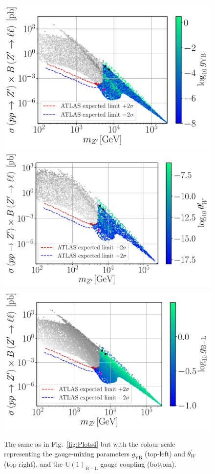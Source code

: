 \documentclass[a4paper,11pt]{article}
\renewcommand{\[}{\left[}
\renewcommand{\]}{\right]}
\newcommand{\U}[1]{\mathrm{U}(1)_{\mathrm{#1}}}			%
\newcommand{\ro}[1]{\textrm{#1}}
\begin{document}
\begin{figure}[!htb]
	\centering
	\includegraphics[scale=0.37]{mZp_Xsec_gYB.pdf}
	\includegraphics[scale=0.37]{mZp_Xsec_twp.pdf}
	\includegraphics[scale=0.37]{mZp_Xsec_gBL.pdf}	
	\caption{The same as in Fig.~\ref{fig:Plots4} but with the colour scale representing the gauge-mixing parameters $g_\ro{YB}$ (top-left) and $\theta_W^\prime$ (top-right), and the $\U{B-L}$ gauge coupling (bottom).}
	\label{fig:Plots3}
\end{figure}	
\end{document}
